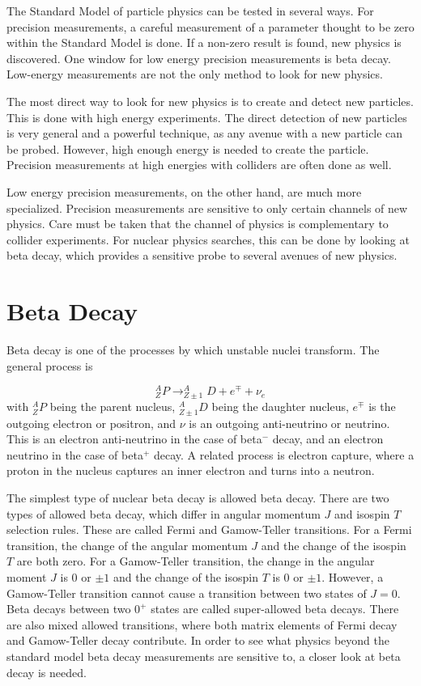 \documentclass[../MaxHughesThesis.tex]{subfiles}
\begin{document}
The Standard Model of particle physics can be tested in several ways.
For precision measurements, a careful measurement of a parameter thought to be zero within the Standard Model is done.
If a non-zero result is found, new physics is discovered.
One window for low energy precision measurements is beta decay.
Low-energy measurements are not the only method to look for new physics.

The most direct way to look for new physics is to create and detect new particles.
This is done with high energy experiments. 
The direct detection of new particles is very general and a powerful technique, as any avenue with a new particle can be probed.
However, high enough energy is needed to create the particle.
Precision measurements at high energies with colliders are often done as well. 
 
Low energy precision measurements, on the other hand, are much more specialized.
Precision measurements are sensitive to only certain channels of new physics.
Care must be taken that the channel of physics is complementary to collider experiments. 
For nuclear physics searches, this can be done by looking at beta decay, which provides a sensitive probe to several avenues of new physics.

\section{Beta Decay}
Beta decay is one of the processes by which unstable nuclei transform. 
The general process is %

\begin{equation}
	\label{eq:betadecay}
	^{A}_{Z}P \rightarrow ^{A}_{Z\pm 1}D + e^{\mp} + \nu_{e}
\end{equation}
with $^{A}_{Z}P$ being the parent nucleus, $^{A}_{Z \pm 1}D$ being the daughter nucleus, $e^{\mp}$ is the outgoing electron or positron, and $\nu$ is an outgoing anti-neutrino or neutrino.
This is an electron anti-neutrino in the case of beta$^{-}$ decay, and an electron neutrino in the case of beta$^{+}$ decay. 
A related process is electron capture, where a proton in the nucleus captures an inner electron and turns into a neutron.

The simplest type of nuclear beta decay is allowed beta decay.
There are two types of allowed beta decay, which differ in angular momentum $J$ and isospin $T$ selection rules.
These are called Fermi and Gamow-Teller transitions. 
For a Fermi transition, the change of the angular momentum $J$ and the change of the isospin $T$ are both zero.
For a Gamow-Teller transition, the change in the angular moment $J$ is $0$ or $\pm1$ and the change of the isospin $T$ is $0$ or $\pm 1$.
However, a Gamow-Teller transition cannot cause a transition between two states of $J = 0$. 
Beta decays between two $0^{+}$ states are called super-allowed beta decays.
There are also mixed allowed transitions, where both matrix elements of Fermi decay and Gamow-Teller decay contribute.
In order to see what physics beyond the standard model beta decay measurements are sensitive to, a closer look at beta decay is needed.
\end{document}
